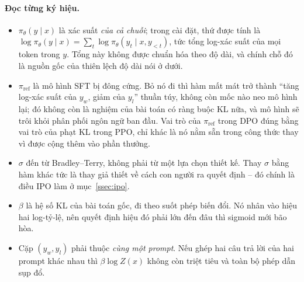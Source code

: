 \paragraph{Đọc từng ký hiệu.}
\begin{itemize}
    \item \( \pi_{\theta}(y \mid x) \) là xác suất \emph{của cả chuỗi}; trong cài đặt, thứ được tính là \( \log \pi_{\theta}(y \mid x) = \sum_t \log \pi_{\theta}(y_t \mid x, y_{<t}) \), tức tổng log-xác suất của mọi token trong \( y \). Tổng này không được chuẩn hóa theo độ dài, và chính chỗ đó là nguồn gốc của thiên lệch độ dài nói ở dưới.
    \item \( \pi_{\text{ref}} \) là mô hình SFT bị đông cứng. Bỏ nó đi thì hàm mất mát trở thành ``tăng log-xác suất của \( y_w \), giảm của \( y_l \)'' thuần túy, không còn mốc nào neo mô hình lại; đó không còn là nghiệm của bài toán có ràng buộc KL nữa, và mô hình sẽ trôi khỏi phân phối ngôn ngữ ban đầu. Vai trò của \( \pi_{\text{ref}} \) trong DPO đúng bằng vai trò của phạt KL trong PPO, chỉ khác là nó nằm sẵn trong công thức thay vì được cộng thêm vào phần thưởng.
    \item \( \sigma \) đến từ Bradley--Terry, không phải từ một lựa chọn thiết kế. Thay \( \sigma \) bằng hàm khác tức là thay giả thiết về cách con người ra quyết định -- đó chính là điều IPO làm ở mục~\ref{ssec:ipo}.
    \item \( \beta \) là hệ số KL của bài toán gốc, đi theo suốt phép biến đổi. Nó nhân vào hiệu hai log-tỷ-lệ, nên quyết định hiệu đó phải lớn đến đâu thì sigmoid mới bão hòa.
    \item Cặp \( (y_w, y_l) \) phải thuộc \emph{cùng một prompt}. Nếu ghép hai câu trả lời của hai prompt khác nhau thì \( \beta\log Z(x) \) không còn triệt tiêu và toàn bộ phép dẫn sụp đổ.
\end{itemize}

